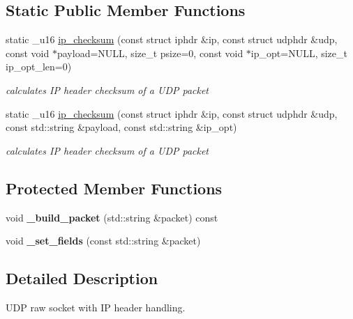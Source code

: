 \subsection*{Static Public Member Functions}
\begin{CompactItemize}
\item 
static \_\-u16 \hyperlink{classsocketpp_1_1UDP__IP__RawSocket_23e1e3f2f4b206d88b6c8ca4e0b514fd}{ip\_\-checksum} (const struct iphdr \&ip, const struct udphdr \&udp, const void $\ast$payload=NULL, size\_\-t psize=0, const void $\ast$ip\_\-opt=NULL, size\_\-t ip\_\-opt\_\-len=0)
\begin{CompactList}\small\item\em calculates IP header checksum of a UDP packet \item\end{CompactList}\item 
static \_\-u16 \hyperlink{classsocketpp_1_1UDP__IP__RawSocket_6af969961a1dbe17e2da9f26dce18463}{ip\_\-checksum} (const struct iphdr \&ip, const struct udphdr \&udp, const std::string \&payload, const std::string \&ip\_\-opt)
\begin{CompactList}\small\item\em calculates IP header checksum of a UDP packet \item\end{CompactList}\end{CompactItemize}
\subsection*{Protected Member Functions}
\begin{CompactItemize}
\item 
\hypertarget{classsocketpp_1_1UDP__IP__RawSocket_25aebd67b52bc7e675930cc812918270}{
void \textbf{\_\-build\_\-packet} (std::string \&packet) const }
\label{classsocketpp_1_1UDP__IP__RawSocket_25aebd67b52bc7e675930cc812918270}

\item 
\hypertarget{classsocketpp_1_1UDP__IP__RawSocket_40fde867fa138b495f660864023a3eb1}{
void \textbf{\_\-set\_\-fields} (const std::string \&packet)}
\label{classsocketpp_1_1UDP__IP__RawSocket_40fde867fa138b495f660864023a3eb1}

\end{CompactItemize}


\subsection{Detailed Description}
UDP raw socket with IP header handling. 

